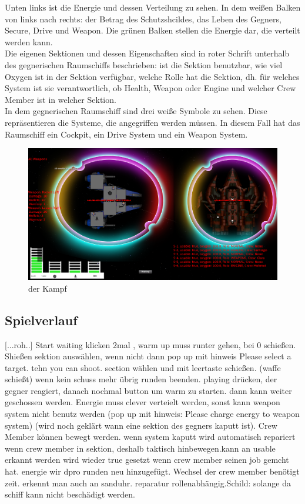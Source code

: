 \documentclass[fontsize=12pt,paper=a4,twoside]{scrartcl}
\begin{document}
Unten links ist die Energie und dessen Verteilung zu sehen. In dem weißen Balken von links nach rechts: der Betrag des Schutzshcildes, das Leben des Gegners, Secure, Drive und Weapon.
Die grünen Balken stellen die Energie dar, die verteilt werden kann.\\

Die eigenen Sektionen und dessen Eigenschaften sind in roter Schrift unterhalb des gegnerischen Raumschiffs beschrieben: ist die Sektion benutzbar, wie viel Oxygen ist in der Sektion verfügbar, welche Rolle hat die Sektion, dh. für welches System ist sie verantwortlich, ob Health, Weapon oder Engine und welcher Crew Member ist in welcher Sektion.\\

In dem gegnerischen Raumschiff sind drei weiße Symbole zu sehen. Diese repräsentieren die Systeme, die angegriffen werden müssen. In diesem Fall hat das Raumschiff
ein Cockpit, ein Drive System und ein Weapon System.\\

\begin{figure}[htp]
	\centering
	\includegraphics[width=1.00\linewidth]{pics/combatScreenRot01.png}
	\caption{der Kampf}
	\label{fig1}
\end{figure}

\subsection{Spielverlauf}

[...roh..]
Start waiting klicken 2mal , warm up muss runter gehen, bei 0 schießen.
Shießen sektion auswählen, wenn nicht dann pop up mit hinweis Please select a target. tehn you can shoot.
section wählen und mit leertaste schießen. (waffe schießt) wenn kein schuss mehr übrig runden beenden. playing drücken, der gegner reagiert, danach nochmal button um warm zu starten.
dann kann weiter geschossen werden.
Energie muss clever verteielt werden, sonst kann weapon system nicht benutz werden (pop up mit hinweis: Please charge energy to weapon system)
(wird noch geklärt wann eine sektion des gegners kaputt ist). Crew Member können bewegt werden. wenn system kaputt wird automatisch repariert wenn
crew member in sektion, deshalb taktisch hinbewegen.kann an usable erkannt werden wird wieder true gesetzt wenn crew member seinen job gemcht hat.
 energie wir dpro runden neu hinzugefügt. Wechsel der crew member benötigt zeit. erkennt man auch an sanduhr.
reparatur rollenabhängig.Schild: solange da schiff kann nicht beschädigt werden.
\end{document}
